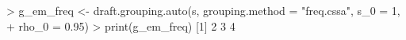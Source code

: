 \begin{CodeChunk}
\begin{CodeInput}


> g_em_freq <- draft.grouping.auto(s, grouping.method = "freq.cssa", s_0 = 1, 
+                                  rho_0 = 0.95)
> print(g_em_freq)
[1] 2 3 4
\end{CodeInput}

\end{CodeChunk}